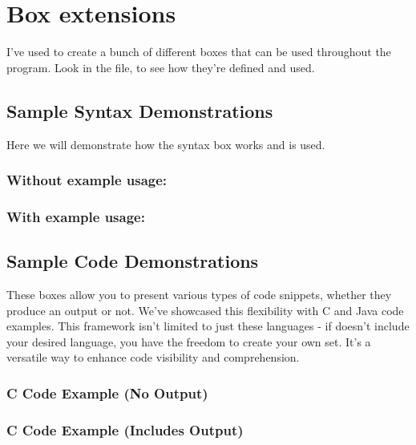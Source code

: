 \section{Box extensions}

I've used  to create a bunch of different boxes that can be used throughout the program. Look in the  file, to see how they're defined and used.


\subsection{Sample Syntax Demonstrations}
Here we will demonstrate how the syntax box works and is used. 

\subsubsection*{Without example usage:}

\subsubsection*{With example usage:}


\subsection{Sample Code Demonstrations}
These boxes allow you to present various types of code snippets, whether they produce an output or not. We've showcased this flexibility with C and Java code examples. This framework isn't limited to just these languages - if  doesn't include your desired language, you have the freedom to create your own set. It's a versatile way to enhance code visibility and comprehension.

\subsubsection{C Code Example (No Output)}


\subsubsection{C Code Example (Includes Output)}

